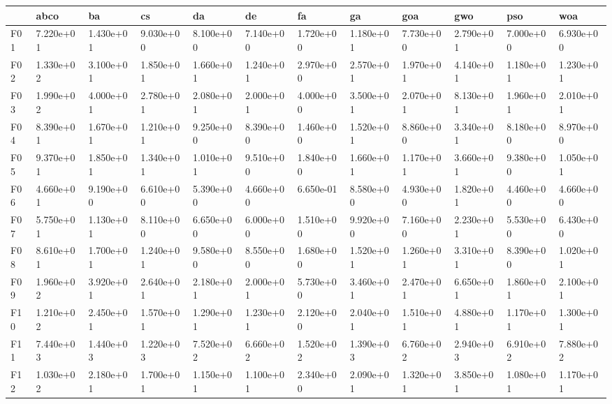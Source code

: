 \begin{table}
    \centering
    \begin{adjustbox}{width=\linewidth}
        \begin{tabular}{llllllllllll}
            \toprule
            {}   & abco      & ba        & cs        & da        & de        & fa        & ga        & goa       & gwo       & pso       & woa       \\
            \midrule
            F01  & 7.220e+01 & 1.430e+01 & 9.030e+00 & 8.100e+00 & 7.140e+00 & 1.720e+00 & 1.180e+01 & 7.730e+00 & 2.790e+01 & 7.000e+00 & 6.930e+00 \\
            F02  & 1.330e+02 & 3.100e+01 & 1.850e+01 & 1.660e+01 & 1.240e+01 & 2.970e+00 & 2.570e+01 & 1.970e+01 & 4.140e+01 & 1.180e+01 & 1.230e+01 \\
            F03  & 1.990e+02 & 4.000e+01 & 2.780e+01 & 2.080e+01 & 2.000e+01 & 4.000e+00 & 3.500e+01 & 2.070e+01 & 8.130e+01 & 1.960e+01 & 2.010e+01 \\
            F04  & 8.390e+01 & 1.670e+01 & 1.210e+01 & 9.250e+00 & 8.390e+00 & 1.460e+00 & 1.520e+01 & 8.860e+00 & 3.340e+01 & 8.180e+00 & 8.970e+00 \\
            F05  & 9.370e+01 & 1.850e+01 & 1.340e+01 & 1.010e+01 & 9.510e+00 & 1.840e+00 & 1.660e+01 & 1.170e+01 & 3.660e+01 & 9.380e+00 & 1.050e+01 \\
            F06  & 4.660e+01 & 9.190e+00 & 6.610e+00 & 5.390e+00 & 4.660e+00 & 6.650e-01 & 8.580e+00 & 4.930e+00 & 1.820e+01 & 4.460e+00 & 4.660e+00 \\
            F07  & 5.750e+01 & 1.130e+01 & 8.110e+00 & 6.650e+00 & 6.000e+00 & 1.510e+00 & 9.920e+00 & 7.160e+00 & 2.230e+01 & 5.530e+00 & 6.430e+00 \\
            F08  & 8.610e+01 & 1.700e+01 & 1.240e+01 & 9.580e+00 & 8.550e+00 & 1.680e+00 & 1.520e+01 & 1.260e+01 & 3.310e+01 & 8.390e+00 & 1.020e+01 \\
            F09  & 1.960e+02 & 3.920e+01 & 2.640e+01 & 2.180e+01 & 2.000e+01 & 5.730e+00 & 3.460e+01 & 2.470e+01 & 6.650e+01 & 1.860e+01 & 2.100e+01 \\
            F10  & 1.210e+02 & 2.450e+01 & 1.570e+01 & 1.290e+01 & 1.230e+01 & 2.120e+00 & 2.040e+01 & 1.510e+01 & 4.880e+01 & 1.170e+01 & 1.300e+01 \\
            F11  & 7.440e+03 & 1.440e+03 & 1.220e+03 & 7.520e+02 & 6.660e+02 & 1.520e+02 & 1.390e+03 & 6.760e+02 & 2.940e+03 & 6.910e+02 & 7.880e+02 \\
            F12  & 1.030e+02 & 2.180e+01 & 1.700e+01 & 1.150e+01 & 1.100e+01 & 2.340e+00 & 2.090e+01 & 1.320e+01 & 3.850e+01 & 1.080e+01 & 1.170e+01 \\

\end{tabular}
\end{adjustbox}
\end{table}
